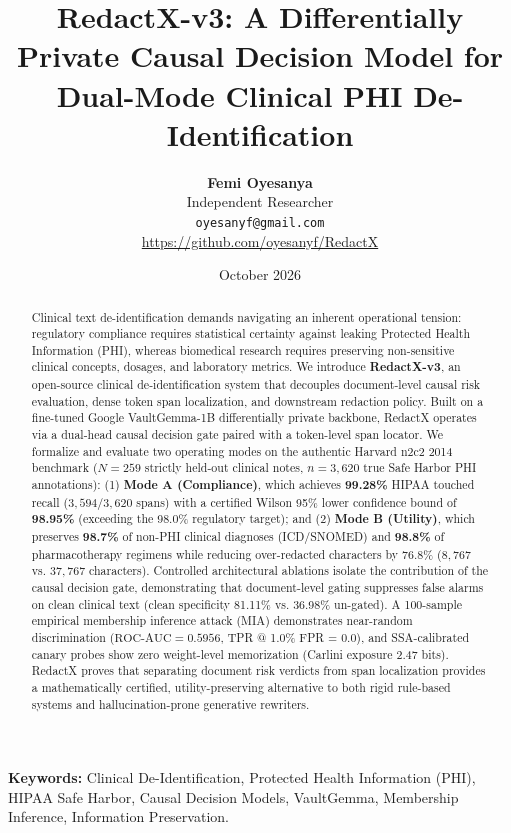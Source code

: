 \documentclass[11pt,a4paper]{article}
\title{\textbf{RedactX-v3: A Differentially Private Causal Decision Model for Dual-Mode Clinical PHI De-Identification}}
\author{
    \textbf{Femi Oyesanya} \\
    Independent Researcher \\
    \texttt{oyesanyf@gmail.com} \\
    \url{https://github.com/oyesanyf/RedactX}
}
\date{October 2026}
\begin{document}
\maketitle

\begin{abstract}
Clinical text de-identification demands navigating an inherent operational tension: regulatory compliance requires statistical certainty against leaking Protected Health Information (PHI), whereas biomedical research requires preserving non-sensitive clinical concepts, dosages, and laboratory metrics. We introduce \textbf{RedactX-v3}, an open-source clinical de-identification system that decouples document-level causal risk evaluation, dense token span localization, and downstream redaction policy. Built on a fine-tuned Google VaultGemma-1B differentially private backbone, RedactX operates via a dual-head causal decision gate paired with a token-level span locator. We formalize and evaluate two operating modes on the authentic Harvard n2c2 2014 benchmark ($N=259$ strictly held-out clinical notes, $n=3,620$ true Safe Harbor PHI annotations): (1) \textbf{Mode A (Compliance)}, which achieves \textbf{99.28\%} HIPAA touched recall ($3,594 / 3,620$ spans) with a certified Wilson 95\% lower confidence bound of \textbf{98.95\%} (exceeding the 98.0\% regulatory target); and (2) \textbf{Mode B (Utility)}, which preserves \textbf{98.7\%} of non-PHI clinical diagnoses (ICD/SNOMED) and \textbf{98.8\%} of pharmacotherapy regimens while reducing over-redacted characters by 76.8\% ($8,767$ vs. $37,767$ characters). Controlled architectural ablations isolate the contribution of the causal decision gate, demonstrating that document-level gating suppresses false alarms on clean clinical text (clean specificity 81.11\% vs. 36.98\% un-gated). A 100-sample empirical membership inference attack (MIA) demonstrates near-random discrimination ($\text{ROC-AUC} = 0.5956$, TPR @ 1.0\% FPR = 0.0), and SSA-calibrated canary probes show zero weight-level memorization (Carlini exposure 2.47 bits). RedactX proves that separating document risk verdicts from span localization provides a mathematically certified, utility-preserving alternative to both rigid rule-based systems and hallucination-prone generative rewriters.
\end{abstract}

\noindent\textbf{Keywords:} Clinical De-Identification, Protected Health Information (PHI), HIPAA Safe Harbor, Causal Decision Models, VaultGemma, Membership Inference, Information Preservation.
\end{document}
